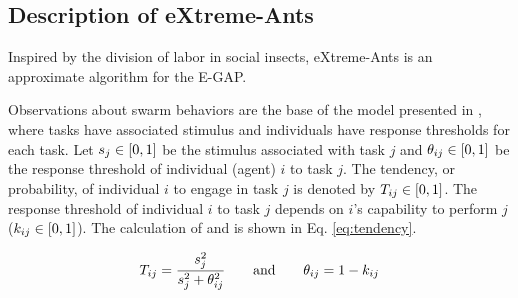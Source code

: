 %	
\subsection{Description of eXtreme-Ants}
\label{sec:x-ants}
Inspired by the division of labor in social insects, eXtreme-Ants is an approximate algorithm for the E-GAP. %

Observations about swarm behaviors are the base of the model presented in \citep{Theraulaz+1998}, where tasks have associated stimulus %
and individuals have response thresholds for each task. Let $s_j \in [0,1]$ be the stimulus associated with task $j$ and $\theta_{ij} \in [0,1]$ be the response threshold of individual (agent) $i$ to task $j$. The tendency, or probability, of individual $i$ to engage in task $j$ is denoted by $T_{ij} \in [0,1]$. The response threshold  of individual $i$ to task $j$ depends on $i$'s capability to perform $j$ ($k_{ij} \in [0,1]$). The calculation of  and  is shown in Eq. \ref{eq:tendency}.

\begin{equation}
\label{eq:tendency}
T_{ij} = \frac{s_j^2}{s_j^2 + \theta_{ij}^2} 
\qquad\text{and}\qquad
\theta_{ij} = 1 - k_{ij} 
\end{equation}


